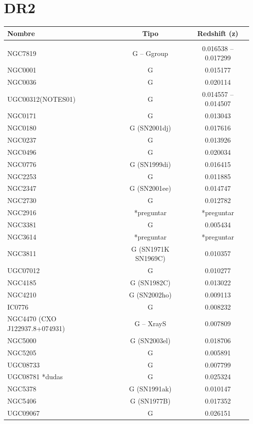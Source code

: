 \documentclass[9pt]{revtex4-1}
\begin{document}
\section{DR2}
 \begin{center}
 \begin{tabular}{ l c c }
 
 Nombre & Tipo & Redshift (z) \\
 \hline
 \hline \\
 
 
 NGC7819 & G -- Ggroup & 0.016538 -- 0.017299 \\
 NGC0001 & G & 0.015177 \\
 NGC0036 & G & 0.020114 \\
 UGC00312(NOTES01) & G & 0.014557 -- 0.014507 \\
 NGC0171 & G & 0.013043 \\
 NGC0180 & G (SN2001dj) & 0.017616 \\
 NGC0237 & G & 0.013926 \\
 NGC0496 & G & 0.020034 \\
 NGC0776 & G (SN1999di) & 0.016415 \\
 NGC2253 & G & 0.011885 \\
 NGC2347 & G (SN2001ee) & 0.014747 \\
 NGC2730 & G & 0.012782 \\
 NGC2916 & *preguntar & *preguntar \\
 NGC3381 & G & 0.005434 \\
 NGC3614 & *preguntar & *preguntar \\
 NGC3811 & G (SN1971K SN1969C) & 0.010357 \\
 UGC07012 & G & 0.010277 \\
 NGC4185 & G (SN1982C) & 0.013022 \\
 NGC4210 & G (SN2002ho) & 0.009113 \\
 IC0776  & G & 0.008232 \\
 NGC4470 (CXO J122937.8+074931) & G -- XrayS & 0.007809 \\
 NGC5000 & G (SN2003el) & 0.018706 \\
 NGC5205 & G & 0.005891 \\
 UGC08733 & G & 0.007799 \\
 UGC08781 *dudas & G & 0.025324 \\
 NGC5378 & G (SN1991ak) & 0.010147 \\
 NGC5406 & G (SN1977B) & 0.017352 \\
 UGC09067 & G & 0.026151 \\

\end{tabular}
\end{center}
\end{document}
